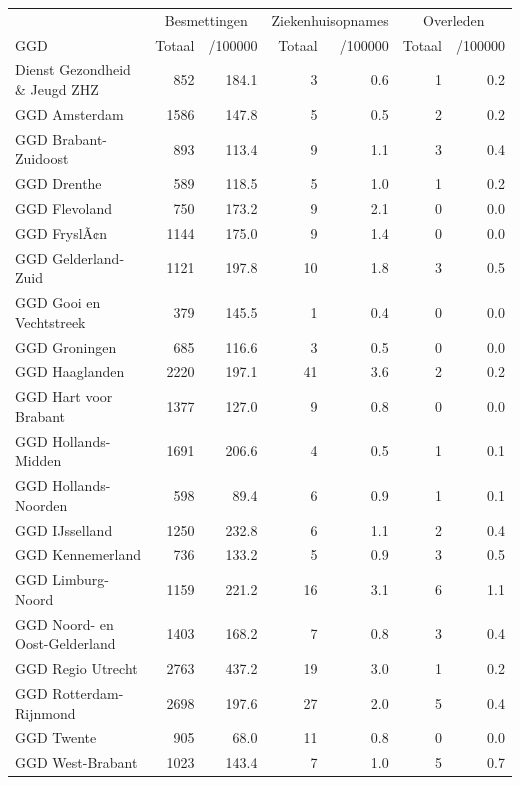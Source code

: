 \documentclass[
  english,
  man,floatsintext]{apa6}
\begin{document}
\begin{table}
\centering\begingroup\fontsize{10}{12}\selectfont

\begin{threeparttable}
\begin{tabular}{lrrrrrr}
\toprule
\multicolumn{1}{c}{ } & \multicolumn{2}{c}{Besmettingen} & \multicolumn{2}{c}{Ziekenhuisopnames} & \multicolumn{2}{c}{Overleden} \\
\cmidrule(l{3pt}r{3pt}){2-3} \cmidrule(l{3pt}r{3pt}){4-5} \cmidrule(l{3pt}r{3pt}){6-7}
GGD & Totaal & /100000 & Totaal & /100000 & Totaal & /100000\\
\midrule
Dienst Gezondheid \& Jeugd ZHZ & 852 & 184.1 & 3 & 0.6 & 1 & 0.2\\
GGD Amsterdam & 1586 & 147.8 & 5 & 0.5 & 2 & 0.2\\
GGD Brabant-Zuidoost & 893 & 113.4 & 9 & 1.1 & 3 & 0.4\\
GGD Drenthe & 589 & 118.5 & 5 & 1.0 & 1 & 0.2\\
GGD Flevoland & 750 & 173.2 & 9 & 2.1 & 0 & 0.0\\
GGD FryslÃ¢n & 1144 & 175.0 & 9 & 1.4 & 0 & 0.0\\
GGD Gelderland-Zuid & 1121 & 197.8 & 10 & 1.8 & 3 & 0.5\\
GGD Gooi en Vechtstreek & 379 & 145.5 & 1 & 0.4 & 0 & 0.0\\
GGD Groningen & 685 & 116.6 & 3 & 0.5 & 0 & 0.0\\
GGD Haaglanden & 2220 & 197.1 & 41 & 3.6 & 2 & 0.2\\
GGD Hart voor Brabant & 1377 & 127.0 & 9 & 0.8 & 0 & 0.0\\
GGD Hollands-Midden & 1691 & 206.6 & 4 & 0.5 & 1 & 0.1\\
GGD Hollands-Noorden & 598 & 89.4 & 6 & 0.9 & 1 & 0.1\\
GGD IJsselland & 1250 & 232.8 & 6 & 1.1 & 2 & 0.4\\
GGD Kennemerland & 736 & 133.2 & 5 & 0.9 & 3 & 0.5\\
GGD Limburg-Noord & 1159 & 221.2 & 16 & 3.1 & 6 & 1.1\\
GGD Noord- en Oost-Gelderland & 1403 & 168.2 & 7 & 0.8 & 3 & 0.4\\
GGD Regio Utrecht & 2763 & 437.2 & 19 & 3.0 & 1 & 0.2\\
GGD Rotterdam-Rijnmond & 2698 & 197.6 & 27 & 2.0 & 5 & 0.4\\
GGD Twente & 905 & 68.0 & 11 & 0.8 & 0 & 0.0\\
GGD West-Brabant & 1023 & 143.4 & 7 & 1.0 & 5 & 0.7\\

\end{tabular}
\end{threeparttable}
\end{table}
\end{document}
